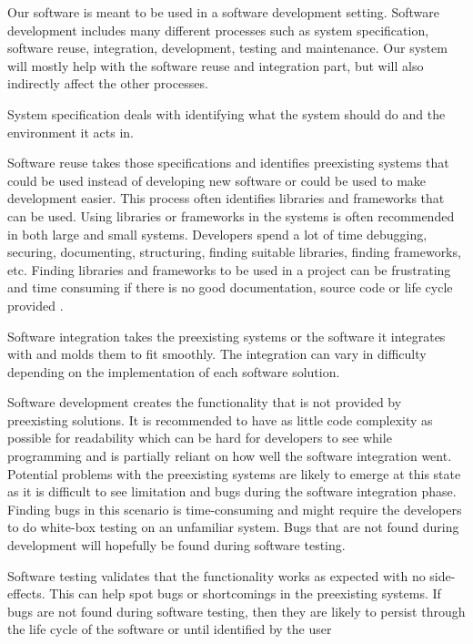 Our software is meant to be used in a software development setting. Software development \cite{wiki:softwareDevelopment} includes many different processes such as system specification, software reuse, integration, development, testing and maintenance. Our system will mostly help with the software reuse and integration part, but will also indirectly affect the other processes.

System specification deals with identifying what the system should do and the environment it acts in.

Software reuse takes those specifications and identifies preexisting systems that could be used instead of developing new software or could be used to make development easier. This process often identifies libraries and frameworks that can be used. Using libraries or frameworks in the systems is often recommended \cite{Krueger:1992:SR:130844.130856} in both large and small systems. Developers spend a lot of time debugging, securing, documenting, structuring, finding suitable libraries, finding frameworks, etc. Finding libraries and frameworks to be used in a project can be frustrating and time consuming if there is no good documentation, source code or life cycle provided \cite{mileva2009mining}.

Software integration takes the preexisting systems or the software it integrates with and molds them to fit smoothly. The integration can vary in difficulty depending on the implementation of each software solution. 

Software development creates the functionality that is not provided by preexisting solutions. It is recommended to have as little code complexity \cite{DBLP:journals/corr/abs-1712-00675} as possible for readability  \cite{spinellis2003readingWritingCode} which can be hard for developers to see while programming and is partially reliant on how well the software integration went. Potential problems with the preexisting systems are likely to emerge at this state as it is difficult to see limitation and bugs during the software integration phase. Finding bugs in this scenario is time-consuming \cite{westland2002cost} and might require the developers to do white-box testing on an unfamiliar system.
Bugs that are not found during development will hopefully be found during software testing.

Software testing validates that the functionality works as expected with no side-effects. This can help spot bugs or shortcomings in the preexisting systems. If bugs are not found during software testing, then they are likely to persist through the life cycle of the software or until identified by the user

